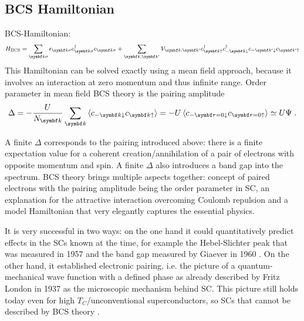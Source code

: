 \documentclass[../notes.tex]{subfiles}
\begin{document}
\subsection*{BCS Hamiltonian}


BCS-Hamiltonian:
\begin{equation}\label{eq:BCS Hamiltonian}
	H_{\text{BCS}} = \sum_{\vb{k}\sigma} \epsilon_{\vb{k}\sigma} c_{\vb{k}\sigma}^{\dagger} c_{\vb{k}\sigma} + \sum_{\vb{k}, \vb{k}^{\prime}} V_{\vb{k}, \vb{k}^{\prime}} c_{\vb{k}\uparrow}^{\dagger} c_{-\vb{k}\downarrow}^{\dagger} c_{-\vb{k}^{\prime}\downarrow} c_{\vb{k}^{\prime}\uparrow}
\end{equation}
This Hamiltonian can be solved exactly using a mean field approach, because it involves an interaction at zero momentum and thus infinite range.
Order parameter in mean field BCS theory is the pairing amplitude
\begin{equation}
	\Delta = - \frac{U}{N_{\vb{k}}} \sum_{\vb{k}} \braket{c_{-\vb{k} \downarrow} c_{\vb{k} \uparrow}} = - U \braket{c_{-\vb{r}=0 \downarrow} c_{\vb{r=0} \uparrow}} \simeq U \Psi \;.
\end{equation}

A finite \(\Delta\) corresponds to the pairing introduced above: there is a finite expectation value for a coherent creation/annihilation of a pair of electrons with opposite momentum and spin.
A finite \(\Delta\) also introduces a band gap into the spectrum.
BCS theory brings multiple aspects together: concept of paired electrons with the pairing amplitude being the order parameter in SC, an explanation for the attractive interaction overcoming Coulomb repulsion and a model Hamiltonian that very elegantly captures the essential physics.

It is very successful in two ways: on the one hand it could quantitatively predict effects in the SCs known at the time, for example the Hebel-Slichter peak that was measured in 1957 \cite{hebelNuclearRelaxationSuperconducting1957, hebelNuclearSpinRelaxation1959} and the band gap measured by Giaever in 1960 \cite{giaeverStudySuperconductorsElectron1961}.  
On the other hand, it established electronic pairing, i.e. the picture of a quantum-mechanical wave function with a defined phase as already described by Fritz London in 1937 \cite{londonNewConceptionSupraconductivity1937} as the microscopic mechanism behind SC.
This picture still holds today even for high \(T_C\)/unconventional superconductors, so SCs that cannot be described by BCS theory \cite{zhouHightemperatureSuperconductivity2021}.
\end{document}
